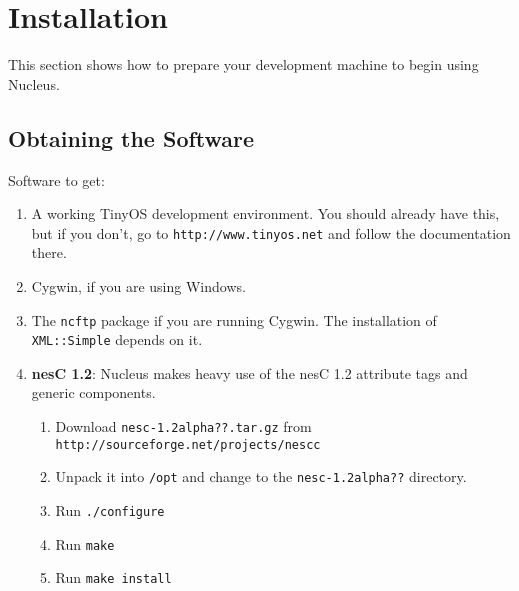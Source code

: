 \documentclass{article}
\begin{document}
\newpage

\section{Installation}

This section shows how to prepare your development machine to begin
using Nucleus.

\subsection{Obtaining the Software}

Software to get:

\begin{enumerate}
\item A working TinyOS development environment. You should already
  have this, but if you don't, go to {\tt http://www.tinyos.net} and
  follow the documentation there.
\item Cygwin, if you are using Windows.
\item The {\tt ncftp} package if you are running Cygwin. The installation of {\tt XML::Simple} depends on it.
\item {\bf nesC 1.2}: Nucleus
makes heavy use of the nesC 1.2 attribute tags and generic
components. 
\begin{enumerate}
\item Download {\tt nesc-1.2alpha??.tar.gz} from {\tt http://sourceforge.net/projects/nescc}
\item Unpack it into {\tt /opt} and change to the {\tt nesc-1.2alpha??} directory.
\item Run {\tt ./configure}
\item Run {\tt make}
\item Run {\tt make install}
\end{enumerate}

\end{enumerate}
\end{document}
